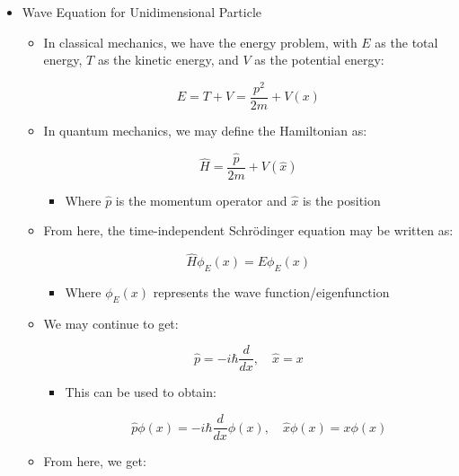 \begin{itemize}

  \item Wave Equation for Unidimensional Particle

    \begin{itemize}

      \item In classical mechanics, we have the energy problem, with $E$ as the total energy, $T$ as the kinetic energy, and $V$ as the potential energy:

        $$E=T+V=\frac{p^2}{2m}+V(x)$$

      \item In quantum mechanics, we may define the Hamiltonian as:

        $$\hat{H}=\frac{\hat{p}}{2m}+V(\hat{x})$$

        \begin{itemize}

          \item Where $\hat{p}$ is the momentum operator and $\hat{x}$ is the position

        \end{itemize}

      \item From here, the time-independent Schr\"odinger equation may be written as:

        $$\hat{H}\phi_E(x)=E\phi_E(x)$$

        \begin{itemize}

          \item Where $\phi_E(x)$ represents the wave function/eigenfunction

        \end{itemize}

      \item We may continue to get:

        $$\hat{p}=-i\hbar\frac{d}{dx},\quad \hat{x}=x$$

        \begin{itemize}

          \item This can be used to obtain:

            $$\hat{p}\phi(x)=-i\hbar\frac{d}{dx}\phi(x),\quad \hat{x}\phi(x)=x\phi(x)$$

        \end{itemize}

      \item From here, we get:


\end{itemize}
\end{itemize}
